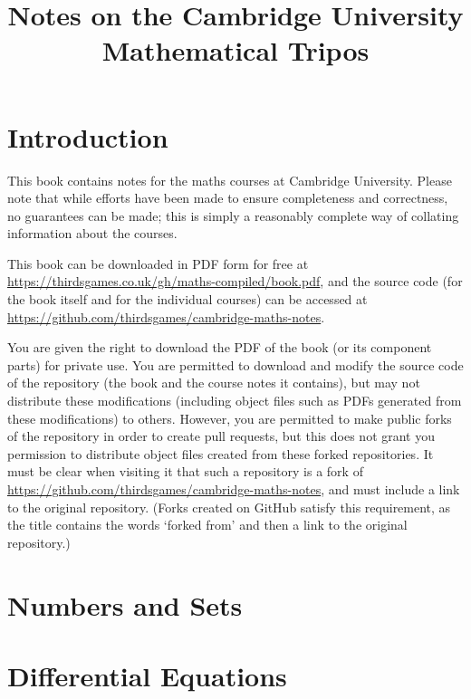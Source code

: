 \documentclass{book}
\title{Notes on the Cambridge University Mathematical Tripos}
\author{}
\begin{document}
\maketitle

\tableofcontents
\newpage

\chapter*{Introduction}
This book contains notes for the maths courses at Cambridge University. Please note that while efforts have been made to ensure completeness and correctness, no guarantees can be made; this is simply a reasonably complete way of collating information about the courses.

This book can be downloaded in PDF form for free at \url{https://thirdsgames.co.uk/gh/maths-compiled/book.pdf}, and the source code (for the book itself and for the individual courses) can be accessed at \url{https://github.com/thirdsgames/cambridge-maths-notes}.

You are given the right to download the PDF of the book (or its component parts) for private use. You are permitted to download and modify the source code of the repository (the book and the course notes it contains), but may not distribute these modifications (including object files such as PDFs generated from these modifications) to others. However, you are permitted to make public forks of the repository in order to create pull requests, but this does not grant you permission to distribute object files created from these forked repositories. It must be clear when visiting it that such a repository is a fork of \url{https://github.com/thirdsgames/cambridge-maths-notes}, and must include a link to the original repository. (Forks created on GitHub satisfy this requirement, as the title contains the words `forked from' and then a link to the original repository.)

\let\maketitle\ignorespaces
\renewcommand{\tableofcontentsnewpage}{}

\chapter{Numbers and Sets}

\chapter{Differential Equations}

\end{document}
